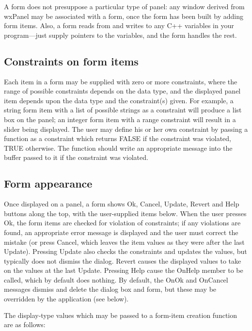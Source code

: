 A form does not presuppose a particular type of panel: any window
derived from wxPanel may be associated with a form, once the form has
been built by adding form items. Also, a form reads from and writes to
any C++ variables in your program---just supply pointers to the variables,
and the form handles the rest.

\subsection{Constraints on form items}

Each item in a form may be supplied with zero or more constraints, where
the range of possible constraints depends on the data type, and the
displayed panel item depends upon the data type and the constraint(s)
given.  For example, a string form item with a list of possible strings
as a constraint will produce a list box on the panel; an integer form
item with a range constraint will result in a slider being displayed.
The user may define his or her own constraint by passing a function as a
constraint which returns FALSE if the constraint was violated, TRUE
otherwise.  The function should write an appropriate message into the
buffer passed to it if the constraint was violated.

\subsection{Form appearance}

Once displayed on a panel, a form shows Ok, Cancel, Update, Revert and
Help buttons along the top, with the user-supplied items below. When the
user presses Ok, the form items are checked for violation of
constraints; if any violations are found, an appropriate error message
is displayed and the user must correct the mistake (or press Cancel,
which leaves the item values as they were after the last Update).
Pressing Update also checks the constraints and updates the values, but
typically does not dismiss the dialog. Revert causes the displayed
values to take on the values at the last Update. Pressing Help cause the
OnHelp member to be called, which by default does nothing. By default,
the OnOk and OnCancel messages dismiss and delete the dialog box and
form, but these may be overridden by the application (see below).

The display-type values which may be passed to a form-item creation
function are as follows:

